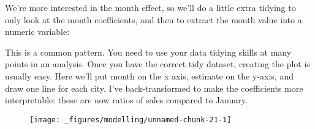 We're more interested in the month effect, so we'll do a little extra
tidying to only look at the month coefficients, and then to extract the
month value into a numeric variable:

\begin{Shaded}
\end{Shaded}

This is a common pattern. You need to use your data tidying skills at
many points in an analysis. Once you have the correct tidy dataset,
creating the plot is usually easy. Here we'll put month on the x axis,
estimate on the y-axis, and draw one line for each city. I've
back-transformed to make the coefficients more interpretable: these are
now ratios of sales compared to January.

\begin{Shaded}
\begin{Highlighting}[]
 \NormalTok{^}\StringTok{ }
\StringTok{  }\NormalTok{(}\NormalTok{(} 
\end{Highlighting}
\end{Shaded}

\begin{figure}[H]
  \centering
  \texttt{[image: \_figures/modelling/unnamed-chunk-21-1]}
\end{figure}

